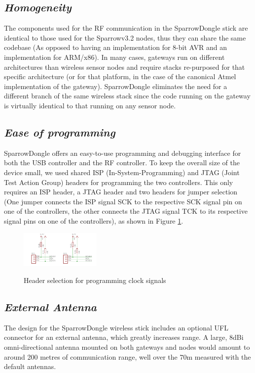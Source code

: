 \subsection{\textit{Homogeneity}}  

\label{sec:homo}

The components used for the RF communication in the SparrowDongle stick are
identical to those used for the Sparrowv3.2 nodes, thus they can share the same
codebase (As opposed to having an implementation for 8-bit AVR and an
implementation for ARM/x86). In many cases, gateways run on different
architectures than wireless sensor nodes and require stacks re-purposed for
that specific architecture (or for that platform, in the case of the canonical
Atmel implementation of the gateway). SparrowDongle eliminates the need for a
different branch of the same wireless stack since the code running on the
gateway is virtually identical to that running on any sensor node.

\subsection{\textit{Ease of programming}} 

\label{sec:pro}

SparrowDongle offers an easy-to-use programming and debugging interface for
both the USB controller and the RF controller. To keep the overall size of the
device small, we used shared ISP (In-System-Programming) and JTAG (Joint Test
Action Group) headers for programming the two controllers. This only requires
an ISP header, a JTAG header and two headers for jumper selection (One jumper
connects the ISP signal SCK to the respective SCK signal pin on one of the
controllers, the other connects the JTAG signal TCK to its respective signal
pins on one of the controllers), as shown in Figure \ref{fig:progr}.


\begin{figure}[ht] \centering \label{fig:progr}
\includegraphics[width=0.35\textwidth]{img/progr.png} \caption{Header selection
for programming clock signals} \end{figure}


\subsection{\textit{External Antenna}}

\label{sec:ant}

The design for the SparrowDongle wireless stick includes an optional UFL
connector for an external antenna, which greatly increases range. A large, 8dBi
omni-directional antenna mounted on both gateways and nodes would amount to
around 200 metres of communication range, well over the 70m measured with the
default antennas.



